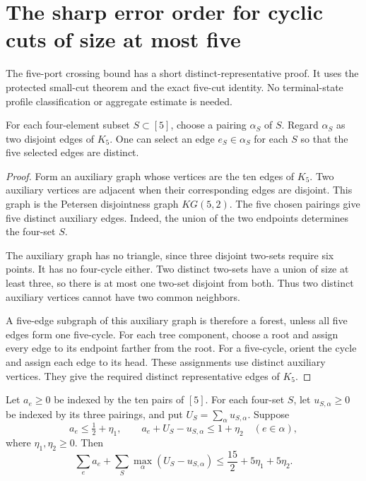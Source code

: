 \section{The sharp error order for cyclic cuts of size at most five}
\label{sec:five-cut-universal-crossing}

The five-port crossing bound has a short distinct-representative proof.
It uses the protected small-cut theorem and the exact five-cut identity.
No terminal-state profile classification or aggregate estimate is needed.

\begin{lemma}
\label{lem:five-pairing-distinct-representatives}
For each four-element subset $S\subset[5]$, choose a pairing $\alpha_S$ of $S$.
Regard $\alpha_S$ as two disjoint edges of $K_5$.
One can select an edge $e_S\in\alpha_S$ for each $S$ so that the five selected edges are distinct.
\end{lemma}

\begin{proof}
Form an auxiliary graph whose vertices are the ten edges of $K_5$.
Two auxiliary vertices are adjacent when their corresponding edges are disjoint.
This graph is the Petersen disjointness graph $KG(5,2)$.
The five chosen pairings give five distinct auxiliary edges.
Indeed, the union of the two endpoints determines the four-set $S$.

The auxiliary graph has no triangle, since three disjoint two-sets require six points.
It has no four-cycle either.
Two distinct two-sets have a union of size at least three, so there is at most one two-set disjoint from both.
Thus two distinct auxiliary vertices cannot have two common neighbors.

A five-edge subgraph of this auxiliary graph is therefore a forest, unless all five edges form one five-cycle.
For each tree component, choose a root and assign every edge to its endpoint farther from the root.
For a five-cycle, orient the cycle and assign each edge to its head.
These assignments use distinct auxiliary vertices.
They give the required distinct representative edges of $K_5$.
\end{proof}

\begin{lemma}
\label{lem:universal-five-port-functional}
Let $a_e\ge0$ be indexed by the ten pairs of $[5]$.
For each four-set $S$, let $u_{S,\alpha}\ge0$ be indexed by its three pairings, and put $U_S=\sum_\alpha u_{S,\alpha}$.
Suppose
\[
 a_e\le\tfrac12+\eta_1,
 \qquad
 a_e+U_S-u_{S,\alpha}\le1+\eta_2
 \quad(e\in\alpha),
\]
where $\eta_1,\eta_2\ge0$.
Then
\[
 \sum_e a_e+\sum_S\max_\alpha(U_S-u_{S,\alpha})
 \le\frac{15}{2}+5\eta_1+5\eta_2.
\]
\end{lemma}

